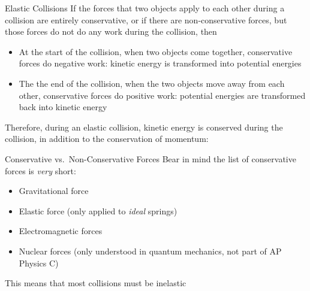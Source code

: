 \documentclass[12pt,compress,aspectratio=169]{beamer}
\begin{document}
\begin{frame}{Elastic Collisions}
  If the forces that two objects apply to each other during a collision are
  entirely conservative, or if there are non-conservative forces, but those
  forces do not do any work during the collision, then
  \begin{itemize}
  \item At the start of the collision, when two objects come together,
    conservative forces do negative work: kinetic energy is transformed into
    potential energies
  \item The the end of the collision, when the two objects move away from each
    other, conservative forces do positive work: potential energies are
    transformed back into kinetic energy
  \end{itemize}
  Therefore, during an elastic collision, kinetic energy is conserved during
  the collision, in addition to the conservation of momentum:

  \vspace{.15in}
\end{frame}






\begin{frame}{Conservative vs.\ Non-Conservative Forces}
  Bear in mind the list of conservative forces is \emph{very} short:
  \begin{itemize}
  \item Gravitational force
  \item Elastic force (only applied to \emph{ideal} springs)
  \item Electromagnetic forces
  \item Nuclear forces (only understood in quantum mechanics, not part of AP
    Physics C)
  \end{itemize}
  This means that most collisions must be inelastic
\end{frame}
\end{document}
